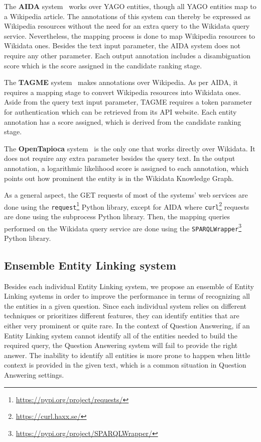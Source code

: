 The \textbf{AIDA} system~\cite{EL:aida-tool-YosefHBSW11, EL:aida-HoffartYBFPSTTW11} works over 
YAGO entities, though all YAGO entities map to a Wikipedia article. The annotations of this 
system can thereby be expressed as Wikipedia resources without the need for an extra query to 
the Wikidata query service. Nevertheless, the mapping process is done to map Wikipedia resources 
to Wikidata ones. Besides the text input parameter, the AIDA system does not require any other 
parameter. Each output annotation includes a disambiguation score which is the score assigned 
in the candidate ranking stage.

The \textbf{TAGME} system~\cite{EL:tagme-FerraginaS10} makes annotations over Wikipedia. As 
per AIDA, it requires a mapping stage to convert Wikipedia resources into Wikidata ones. 
Aside from the query text input parameter, TAGME requires a token parameter for authentication 
which can be retrieved from its API website. Each entity annotation has a  score 
assigned, which is derived from the candidate ranking stage.

The \textbf{OpenTapioca} system~\cite{EL:opentapioca-Delpeuch19} is the only one that works 
directly over Wikidata. It does not require any extra parameter besides the query text. In 
the output annotation, a logarithmic likelihood score is assigned to each annotation, which 
points out how prominent the entity is in the Wikidata Knowledge Graph.

As a general aspect, the GET requests of most of the systems’ web services are done using the 
\texttt{request}\footnote{\url{https://pypi.org/project/requests/}} Python library, except for AIDA 
where \texttt{curl}\footnote{\url{https://curl.haxx.se/}} requests are done using the subprocess 
Python library. Then, the mapping queries performed on the Wikidata query service are done 
using the \texttt{SPARQLWrapper}\footnote{\url{https://pypi.org/project/SPARQLWrapper/}} Python 
library.

\subsection{Ensemble Entity Linking system}
\label{cap3:system/entLinModule/ensembleSystems}
Besides each individual Entity Linking system, we propose an ensemble of Entity Linking systems 
in order to improve the performance in terms of recognizing all the entities in a given 
question. Since each individual system relies on different techniques or prioritizes different 
features, they can identify entities that are either very prominent or quite rare. In the 
context of Question Answering, if an Entity Linking system cannot identify all of the entities 
needed to build the required \SPARQL{} query, the Question Answering system will fail to provide 
the right answer. The inability to identify all entities is more prone to happen when little 
context is provided in the given text, which is a common situation in Question Answering 
settings.

